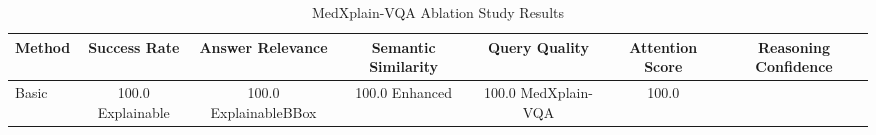 \begin{table}
\caption{MedXplain-VQA Ablation Study Results}
\label{tab:medxplain_ablation}
\begin{tabular}{l|c|c|c|c|c|c}
\toprule
Method & Success Rate & Answer Relevance & Semantic Similarity & Query Quality & Attention Score & Reasoning Confidence \\
\midrule
Basic & 100.0%
Explainable & 100.0%
ExplainableBBox & 100.0%
Enhanced & 100.0%
MedXplain-VQA & 100.0%
\bottomrule
\end{tabular}
\end{table}
